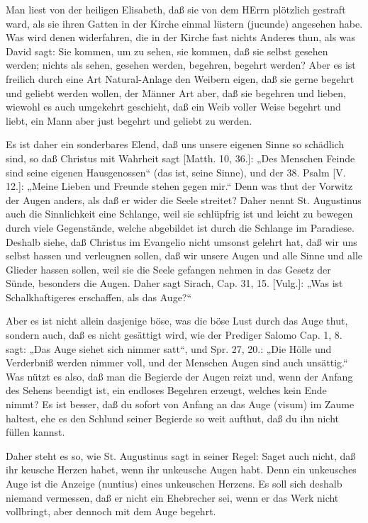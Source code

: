 Man liest von der heiligen Elisabeth, daß sie von dem HErrn plötzlich gestraft ward, als sie ihren Gatten in der Kirche einmal lüstern (jucunde) angesehen habe. Was wird denen widerfahren, die in der Kirche fast nichts Anderes thun, als was David sagt: Sie kommen, um zu sehen, sie kommen, daß sie selbst gesehen werden; nichts als sehen, gesehen werden, begehren, begehrt werden? Aber es ist freilich durch eine Art Natural-Anlage den Weibern eigen, daß sie gerne begehrt und geliebt werden wollen, der Männer Art aber, daß sie begehren und lieben, wiewohl es auch umgekehrt geschieht, daß ein Weib voller Weise begehrt und liebt, ein Mann aber just begehrt und geliebt zu werden.

Es ist daher ein sonderbares Elend, daß uns unsere eigenen Sinne so schädlich sind, so daß Christus mit Wahrheit sagt [Matth. 10, 36.]: „Des Menschen Feinde sind seine eigenen Hausgenossen“ (das ist, seine Sinne), und der 38. Psalm [V. 12.]: „Meine Lieben und Freunde stehen gegen mir.“ Denn was thut der Vorwitz der Augen anders, als daß er wider die Seele streitet? Daher nennt St. Augustinus auch die Sinnlichkeit eine Schlange, weil sie schlüpfrig ist und leicht zu bewegen durch viele Gegenstände, welche abgebildet ist durch die Schlange im Paradiese. Deshalb siehe, daß Christus im Evangelio nicht umsonst gelehrt hat, daß wir uns selbst hassen und verleugnen sollen, daß wir unsere Augen und alle Sinne und alle Glieder hassen sollen, weil sie die Seele gefangen nehmen in das Gesetz der Sünde, besonders die Augen. Daher sagt Sirach, Cap. 31, 15. [Vulg.]: „Was ist Schalkhaftigeres erschaffen, als das Auge?“

Aber es ist nicht allein dasjenige böse, was die böse Lust durch das Auge thut, sondern auch, daß es nicht gesättigt wird, wie der Prediger Salomo Cap. 1, 8. sagt: „Das Auge siehet sich nimmer satt“, und Spr. 27, 20.: „Die Hölle und Verderbniß werden nimmer voll, und der Menschen Augen sind auch unsättig.“ Was nützt es also, daß man die Begierde der Augen reizt und, wenn der Anfang des Sehens beendigt ist, ein endloses Begehren erzeugt, welches kein Ende nimmt? Es ist besser, daß du sofort von Anfang an das Auge (visum) im Zaume haltest, ehe es den Schlund seiner Begierde so weit aufthut, daß du ihn nicht füllen kannst.

Daher steht es so, wie St. Augustinus sagt in seiner Regel: Saget auch nicht, daß ihr keusche Herzen habet, wenn ihr unkeusche Augen habt. Denn ein unkeusches Auge ist die Anzeige (nuntius) eines unkeuschen Herzens. Es soll sich deshalb niemand vermessen, daß er nicht ein Ehebrecher sei, wenn er das Werk nicht vollbringt, aber dennoch mit dem Auge begehrt.

